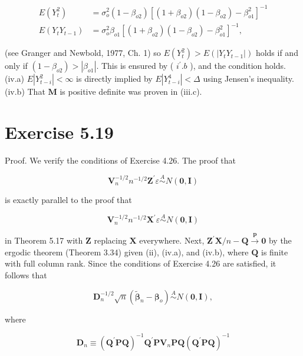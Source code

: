 \documentclass[10pt]{article}
\begin{document}
$$
\begin{aligned}
E\left(Y_{t}^{2}\right) & =\sigma_{o}^{2}\left(1-\beta_{o 2}\right)\left[\left(1+\beta_{o 2}\right)\left(1-\beta_{o 2}\right)-\beta_{o 1}^{2}\right]^{-1} \\
E\left(Y_{t} Y_{t-1}\right) & =\sigma_{o}^{2} \beta_{o 1}\left[\left(1+\beta_{o 2}\right)\left(1-\beta_{o 2}\right)-\beta_{o 1}^{2}\right]^{-1},
\end{aligned}
$$

(see Granger and Newbold, 1977, Ch. 1) so $E\left(Y_{t}^{2}\right)>E\left(\left|Y_{t} Y_{t-1}\right|\right)$ holds if and only if $\left(1-\beta_{o 2}\right)>\left|\beta_{o 1}\right|$. This is ensured by ( $i^{\prime} . b$ ), and the condition holds.\\
(iv.a) $E\left|Y_{t-i}^{2}\right|<\infty$ is directly implied by $E\left|Y_{t-i}^{4}\right|<\Delta$ using Jensen's inequality.\\
(iv.b) That $\mathbf{M}$ is positive definite was proven in (iii.c).

\section*{Exercise 5.19}
Proof. We verify the conditions of Exercise 4.26. The proof that

$$
\mathbf{V}_{n}^{-1 / 2} n^{-1 / 2} \mathbf{Z}^{\prime} \varepsilon \stackrel{A}{\sim} N(\mathbf{0}, \mathbf{I})
$$

is exactly parallel to the proof that

$$
\mathbf{V}_{n}^{-1 / 2} n^{-1 / 2} \mathbf{X}^{\prime} \varepsilon \stackrel{A}{\sim} N(\mathbf{0}, \mathbf{I})
$$

in Theorem 5.17 with $\mathbf{Z}$ replacing $\mathbf{X}$ everywhere. Next, $\mathbf{Z}^{\prime} \mathbf{X} / n-\mathbf{Q} \xrightarrow{\boldsymbol{p}} \mathbf{0}$ by the ergodic theorem (Theorem 3.34) given (ii), (iv.a), and (iv.b), where $\mathbf{Q}$ is finite with full column rank. Since the conditions of Exercise 4.26 are satisfied, it follows that

$$
\mathbf{D}_{n}^{-1 / 2} \sqrt{n}\left(\tilde{\boldsymbol{\beta}}_{n}-\boldsymbol{\beta}_{o}\right) \stackrel{A}{\sim} N(\mathbf{0}, \mathbf{I}),
$$

where

$$
\mathbf{D}_{n} \equiv\left(\mathbf{Q}^{\prime} \mathbf{P Q}\right)^{-1} \mathbf{Q}^{\prime} \mathbf{P} \mathbf{V}_{n} \mathbf{P Q}\left(\mathbf{Q}^{\prime} \mathbf{P Q}\right)^{-1}
$$
\end{document}
